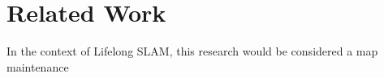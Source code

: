 \section{Related Work}
\label{sec:related_work}

In the context of Lifelong SLAM, this research would be considered a map maintenance 




